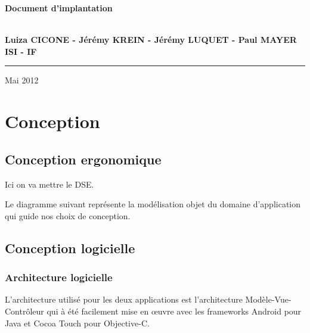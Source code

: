 \documentclass[a4paper, 11px]{article}
\begin{document}
\begin{titlepage}
\begin{center}
\begin{center}
{\Huge \bf Document d'implantation}


\end{center}


\vspace{1cm}

\begin{center}
$ $\\
\large{ \textbf{Luiza CICONE - Jérémy KREIN - Jérémy LUQUET - Paul MAYER}}\\
\large{ \textbf{ISI - IF}}
$ $\\
\end{center}
\rule{\linewidth}{.5pt}


\vfill


{\large Mai 2012}

\end{center}
\end{titlepage}

\tableofcontents

\newpage
\section {Conception}
\subsection{Conception ergonomique}

	Ici on va mettre le DSE.

Le diagramme suivant représente la modélisation objet du domaine d'application qui guide nos choix de conception.

\subsection{Conception logicielle}
\subsubsection{Architecture logicielle}
L'architecture utilisé pour les deux applications est l'architecture Modèle-Vue-Contrôleur qui à été facilement mise en œuvre avec les frameworks Android pour Java et Cocoa Touch pour Objective-C.
\end{document}
